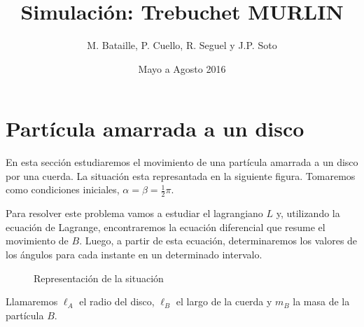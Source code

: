\documentclass[10pt]{article}
\begin{document}
 
\title{Simulación: Trebuchet MURLIN}
\author{M. Bataille, P. Cuello, R. Seguel y J.P. Soto}
\date{Mayo a Agosto 2016}
\maketitle

\section{Partícula amarrada a un disco}

En esta sección estudiaremos el movimiento de una partícula amarrada a un disco por una cuerda. La situación esta represantada
en la siguiente figura. Tomaremos como condiciones iniciales, $\alpha = \beta = \frac12\pi$.

Para resolver este problema vamos a estudiar el lagrangiano $L$ y, utilizando la ecuación de Lagrange, encontraremos la
ecuación diferencial que resume el movimiento de $B$. Luego, a partir de esta ecuación, determinaremos los valores de los ángulos
para cada instante en un determinado intervalo.


\begin{figure}[h]
\centering

\caption{Representación de la situación}
\end{figure}
Llamaremos $\ell_A$ el radio del disco, $\ell_B$ el largo de la cuerda y $m_B$ la masa de la partícula $B$.
\end{document}
